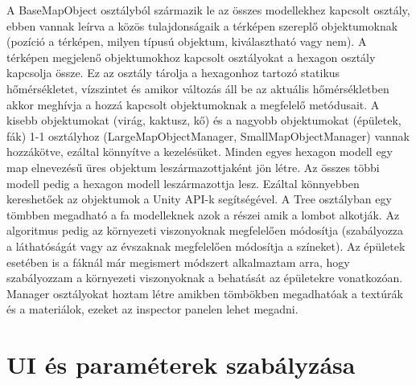 A BaseMapObject osztályból származik le az összes modellekhez kapcsolt osztály, ebben vannak leírva a közös tulajdonságaik a térképen szereplő objektumoknak (pozíció a térképen, milyen típusú objektum, kiválasztható vagy nem). A térképen megjelenő objektumokhoz kapcsolt osztályokat a hexagon osztály kapcsolja össze. Ez az osztály tárolja  a hexagonhoz tartozó statikus hőmérsékletet, vízszintet és amikor változás áll be az aktuális hőmérsékletben akkor meghívja a hozzá kapcsolt objektumoknak a megfelelő metódusait. A kisebb objektumokat (virág, kaktusz, kő) és a nagyobb objektumokat (épületek, fák) 1-1 osztályhoz (LargeMapObjectManager, SmallMapObjectManager) vannak hozzákötve, ezáltal könnyítve a kezelésüket.
\newline
\newline Minden egyes hexagon modell egy map elnevezésű üres objektum leszármazottjaként jön létre. Az összes többi modell pedig a hexagon modell leszármazottja lesz. Ezáltal könnyebben kereshetőek az objektumok a Unity API-k segítségével.
\newline
\newline A Tree osztályban egy tömbben megadható a fa modelleknek azok a részei amik a lombot alkotják. Az algoritmus pedig az környezeti viszonyoknak megfelelően módosítja (szabályozza a láthatóságát vagy az évszaknak megfelelően módosítja a színeket).
\newline
\newline Az épületek esetében is a fáknál már megismert módszert alkalmaztam arra, hogy szabályozzam a környezeti viszonyoknak a behatását az épületekre vonatkozóan.
\newline
\newline Manager osztályokat hoztam létre amikben tömbökben megadhatóak a textúrák és a materiálok, ezeket az inspector panelen lehet megadni.

\section{UI és paraméterek szabályzása}


